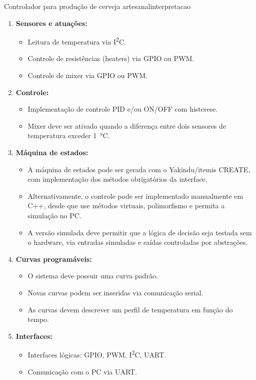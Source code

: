 \begin{problem}{Controlador para produção de cerveja artesanal}{interpretacao}
\begin{enumerate}
    \item \textbf{Sensores e atuações:}
    \begin{itemize}
        \item Leitura de temperatura via I\textsuperscript{2}C.
        \item Controle de resistências (heaters) via GPIO ou PWM.
        \item Controle de mixer via GPIO ou PWM.
    \end{itemize}

    \item \textbf{Controle:}
    \begin{itemize}
        \item Implementação de controle PID e/ou ON/OFF com histerese.
        \item Mixer deve ser ativado quando a diferença entre dois sensores de temperatura exceder \SI{1}{\degreeCelsius}.
    \end{itemize}

        \item \textbf{Máquina de estados:}
    \begin{itemize}
        \item A máquina de estados pode ser gerada com o Yakindu/itemis CREATE, com implementação dos métodos obrigatórios da interface.
        \item Alternativamente, o controle pode ser implementado manualmente em C++, desde que use métodos virtuais, polimorfismo e permita a simulação no PC.
        \item A versão simulada deve permitir que a lógica de decisão seja testada sem o hardware, via entradas simuladas e saídas controladas por abstrações.
    \end{itemize}

    \item \textbf{Curvas programáveis:}
    \begin{itemize}
        \item O sistema deve possuir uma curva padrão.
        \item Novas curvas podem ser inseridas via comunicação serial.
        \item As curvas devem descrever um perfil de temperatura em função do tempo.
    \end{itemize}

    \item \textbf{Interfaces:}
    \begin{itemize}
        \item Interfaces lógicas: GPIO, PWM, I\textsuperscript{2}C, UART.
        \item Comunicação com o PC via UART.
    \end{itemize}


\end{enumerate}
\end{problem}
